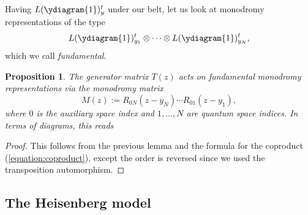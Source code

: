 \documentclass[11pt]{report}
\newtheorem{prop}[theorem]{Proposition}
\theoremstyle{definition}
\theoremstyle{remark}
\theoremstyle{remark}
\begin{document}
Having $L(\ydiagram{1})_y^t$ under our belt, let us look at monodromy representations of the type
\begin{equation*}
L(\ydiagram{1})_{y_1}^t \otimes \cdots \otimes L(\ydiagram{1})_{y_N}^t,
\end{equation*}
which we call \emph{fundamental}.

\begin{prop}
The generator matrix $T(z)$ acts on fundamental monodromy representations via the \emph{monodromy matrix}
\begin{equation*}
M(z) := R_{0N}(z-y_N) \cdots R_{01}(z-y_1),
\end{equation*}
where $0$ is the auxiliary space index and $1,...,N$ are quantum space indices. In terms of diagrams, this reads
\begin{center}
\end{center}
\end{prop}

\begin{proof}
This follows from the previous lemma and the formula for the coproduct (\ref{equation:coproduct}), except the order is reversed since we used the transposition automorphism.
\end{proof}

\subsection{The Heisenberg model}
\end{document}
